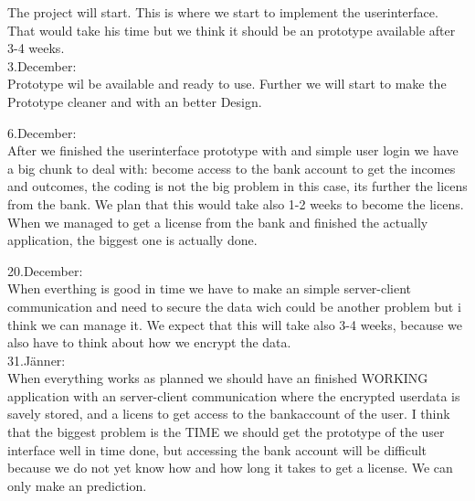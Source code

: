 \documentclass[12pt]{article}
\theoremstyle{definition}
\begin{document}
The project will start. This is where we start to implement the userinterface. That would take his time but we think it should be an prototype available after 3-4 weeks.
\\

3.December:
\\

Prototype wil be available and ready to use. Further we will start to make the Prototype cleaner and with an better Design.

6.December:
\\

After we finished the userinterface prototype with and simple user login we have a big chunk to deal with: become access to the bank account to get the incomes and outcomes, the coding is not the big problem in this case, its further the licens from the bank.
We plan that this would take also 1-2 weeks to become the licens.
When we managed to get a license from the bank and finished the actually application, the biggest one is actually done.
\\
\pagebreak

20.December:
\\

When everthing is good in time we have to make an simple server-client communication and need to secure the data wich could be another problem but i think we can manage it. We expect that this will take also 3-4 weeks, because 
we also have to think about how we encrypt the data.
\\

31.Jänner:
\\

When everything works as planned we should have an finished WORKING application with an server-client communication where the encrypted userdata is savely stored, and a licens to get access to the bankaccount of the user.
I think that the biggest problem is the TIME we should get the prototype of the user interface well in time done, but accessing the bank account will be difficult because we do not yet know how and how long it takes to get a license. We can only make an prediction.
\end{document}
